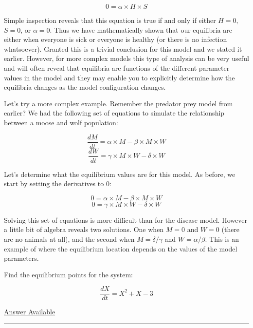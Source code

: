 \documentclass[]{memoir}
\begin{document}
\[ 
0 = \alpha \times H \times S
\]

Simple inspection reveals that this equation is true if and only if
either $H=0$, $S=0$, or $\alpha=0$. Thus we have mathematically shown
that our equilibria are either when everyone is sick or everyone is
healthy (or there is no infection whatsoever). Granted this is a trivial
conclusion for this model and we stated it earlier. However, for more
complex models this type of analysis can be very useful and will often
reveal that equilibria are functions of the different parameter values
in the model and they may enable you to explicitly determine how the
equilibria changes as the model configuration changes.

Let's try a more complex example. Remember the predator prey model from
earlier? We had the following set of equations to simulate the
relationship between a moose and wolf population:

\[ \frac{dM}{dt} = \alpha \times M - \beta \times M \times W \]
\[ \frac{dW}{dt} = \gamma \times M \times W - \delta \times W  \]

Let's determine what the equilibrium values are for this model. As
before, we start by setting the derivatives to 0:

\[ 0 = \alpha \times M - \beta \times M \times W \]
\[ 0 = \gamma \times M \times W - \delta \times W \]

Solving this set of equations is more difficult than for the disease
model. However a little bit of algebra reveals two solutions. One when
$M=0$ and $W=0$ (there are no animals at all), and the second when
$M=\delta/\gamma$ and $W=\alpha/\beta$. This is an example of where the
equilibrium location depends on the values of the model parameters.


Find the equilibrium points for the system:

\[ \frac{dX}{dt} = X^2+X-3\]

\hyperref[Ans-11-2]{Answer Available}

\begin{center}\rule{3in}{0.4pt}\end{center}

\end{document}
